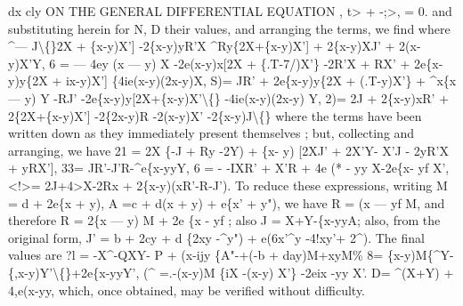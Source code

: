 \documentclass[11pt,a4paper]{book}
\begin{document}
dx
cly
ON THE GENERAL DIFFERENTIAL EQUATION
, t> + -;>, = 0.
and substituting herein
for N, D
their
values, and arranging the
terms, we
find
where
\textasciicircum{}--- J\textbackslash\{\}2X + \{x-y)X']
-2\{x-y)yR'X
\textasciicircum{}Ry\{2X+\{x-y)X']
+ 2\{x-y)XJ'
+ 2(x-y)X'Y,
6 = --- 4ey (x --- y) X
-2e(x-y)x[2X + \{.T-7/)X'\}
-2R'X
+ RX'
+ 2e\{x-y)y\{2X + ix-y)X']
\{4ie(x-y)(2x-y)X,
S)=
JR'
+ 2e\{x-y)y\{2X + (.T-y)X'\}
+ \textasciicircum{}x\{x --- y) Y
-RJ'
-2e\{x-y)y[2X+\{x-y)X'\textbackslash\{\}
-4ie(x-y)(2x-y) Y,
2)=
2J
+ 2\{x-y)xR'
+ 2\{2X+\{x-y)X']
-2\{2x-y)R
-2(x-y)X'
-2\{x-y)J\textbackslash\{\}
where the terms
have
been
written
down
as they immediately present themselves
;
but,
collecting and arranging, we have
21 =
2X \{-J + Ry -2Y) + \{x- y) [2XJ' + 2X'Y- X'J - 2yR'X + yRX'],
33=
JR'-J'R-\textasciicircum{}e\{x-yyY,
6 = - -IXR' + X'R + 4e (*\textbullet{} - yy X-2e\{x- yf X',
<!>=
2J+4>X-2Rx + 2\{x-y)(xR'-R-J').
To reduce these expressions, writing
M = d + 2e\{x + y),
A =c +
d(x + y) + e\{x' + y"),
we have R = (x --- yf M, and
therefore R = 2\{x --- y) M + 2e \{x - yf
;
also
J = X+Y-\{x-yyA;
also, from the
original
form,
J' = b + 2cy + d \{2xy -\textasciicircum{}y") + e(6x'\textasciicircum{}y -4!xy'+ 2\textasciicircum{}).
The
final values are
?l =
-X\textasciicircum{}-QXY- P + (x-ijy \{A"-+(-b + day)M+xyM\%
8=
\{x-y)M\{\textasciicircum{}Y-\textyen{}\{,x-y)Y'\textbackslash\{\}+2e\{x-yyY',
(\textasciicircum{} =.-(x-y)M \{iX -(x-y) X'\} -2eix -yy X'.
D=
\textasciicircum{}(X+Y) + 4,e(x-yy,
which, once obtained, may be
verified without
difficulty.
\end{document}
